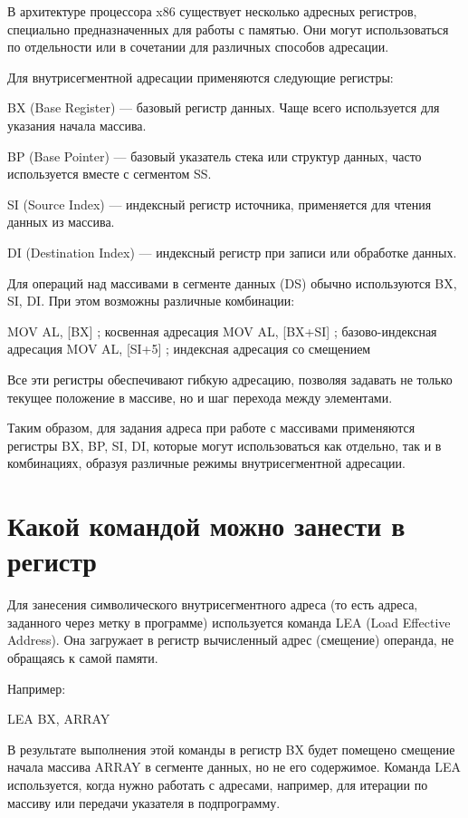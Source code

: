 В архитектуре процессора x86 существует несколько адресных регистров, специально предназначенных для работы с памятью. Они могут использоваться по отдельности или в сочетании для различных способов адресации.

Для внутрисегментной адресации применяются следующие регистры:

BX (Base Register) — базовый регистр данных. Чаще всего используется для указания начала массива.

BP (Base Pointer) — базовый указатель стека или структур данных, часто используется вместе с сегментом SS.

SI (Source Index) — индексный регистр источника, применяется для чтения данных из массива.

DI (Destination Index) — индексный регистр при записи или обработке данных.

Для операций над массивами в сегменте данных (DS) обычно используются BX, SI, DI. При этом возможны различные комбинации:

MOV AL, [BX]         ; косвенная адресация
MOV AL, [BX+SI]      ; базово-индексная адресация
MOV AL, [SI+5]       ; индексная адресация со смещением

Все эти регистры обеспечивают гибкую адресацию, позволяя задавать не только текущее положение в массиве, но и шаг перехода между элементами.

Таким образом, для задания адреса при работе с массивами применяются регистры BX, BP, SI, DI, которые могут использоваться как отдельно, так и в комбинациях, образуя различные режимы внутрисегментной адресации.

\section{Какой командой можно занести в регистр}

Для занесения символического внутрисегментного адреса (то есть адреса, заданного через метку в программе) используется команда LEA (Load Effective Address). Она загружает в регистр вычисленный адрес (смещение) операнда, не обращаясь к самой памяти.

Например:

LEA BX, ARRAY

В результате выполнения этой команды в регистр BX будет помещено смещение начала массива ARRAY в сегменте данных, но не его содержимое. Команда LEA используется, когда нужно работать с адресами, например, для итерации по массиву или передачи указателя в подпрограмму.

